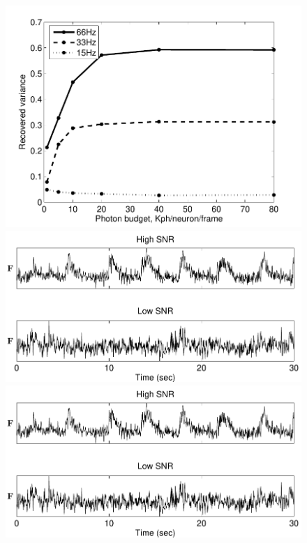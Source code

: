 \begin{figure}[h]
\centering
\begin{minipage}[c]{0.6\hsize}
\includegraphics[width=\hsize]{../figs/FigureA6_recvar_SNR}
\end{minipage}
\begin{minipage}[c]{0.45\hsize}
\includegraphics[width=\hsize]{../figs/example_traces}
\end{minipage}
\begin{minipage}[c]{0.45\hsize}
\includegraphics[width=\hsize]{../figs/example_traces}

\end{minipage}
\end{figure}
